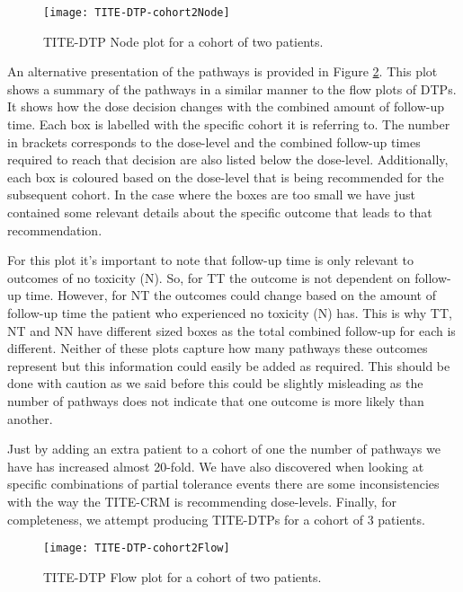 \begin{figure}[h!]
	\centering
	\caption{TITE-DTP Node plot for a cohort of two patients.}
	\label{fig_tite-dtp:TITEDTP-cohort2-node}
	\texttt{[image: TITE-DTP-cohort2Node]}
\end{figure}


An alternative presentation of the pathways is provided in Figure \ref{fig_tite-dtp:TITEDTP-cohort2-flow}. This plot shows a summary of the pathways in a similar manner to the flow plots of DTPs. It shows how the dose decision changes with the combined amount of follow-up time. Each box is labelled with the specific cohort it is referring to. The number in brackets corresponds to the dose-level and the combined follow-up times required to reach that decision are also listed below the dose-level. Additionally, each box is coloured based on the dose-level that is being recommended for the subsequent cohort. In the case where the boxes are too small we have just contained some relevant details about the specific outcome that leads to that recommendation. 

For this plot it's important to note that follow-up time is only relevant to outcomes of no toxicity (N). So, for TT the outcome is not dependent on follow-up time. However, for NT the outcomes could change based on the amount of follow-up time the patient who experienced no toxicity (N) has. This is why TT, NT and NN have different sized boxes as the total combined follow-up for each is different. Neither of these plots capture how many pathways these outcomes represent but this information could easily be added as required. This should be done with caution as we said before this could be slightly misleading as the number of pathways does not indicate that one outcome is more likely than another. 

Just by adding an extra patient to a cohort of one the number of pathways we have has increased almost 20-fold. We have also discovered when looking at specific combinations of partial tolerance events there are some inconsistencies with the way the TITE-CRM is recommending dose-levels. Finally, for completeness, we attempt producing TITE-DTPs for a cohort of 3 patients.   


\begin{figure}[H]
	\centering
	\caption{TITE-DTP Flow plot for a cohort of two patients.}
	\label{fig_tite-dtp:TITEDTP-cohort2-flow}
	\texttt{[image: TITE-DTP-cohort2Flow]}
\end{figure}



